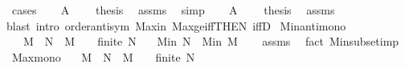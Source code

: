 \begin{isabellebody}
%
\isadelimproof
%
\endisadelimproof
%
\isatagproof
{}\isamarkupfalse%
\ cases\isanewline
\ \ \isamarkupfalse%
\ {\isachardoublequoteopen}A\ {\isacharequal}{\kern0pt}\ {\isacharbraceleft}{\kern0pt}{\isacharbraceright}{\kern0pt}{\isachardoublequoteclose}\ \isamarkupfalse%
\ {\isacharquery}{\kern0pt}thesis\ \isamarkupfalse%
\ assms\ \isamarkupfalse%
\ simp\isanewline
{}\isamarkupfalse%
\isanewline
\ \ \isamarkupfalse%
\ {\isachardoublequoteopen}A\ {\isasymnoteq}\ {\isacharbraceleft}{\kern0pt}{\isacharbraceright}{\kern0pt}{\isachardoublequoteclose}\ \isamarkupfalse%
\ {\isacharquery}{\kern0pt}thesis\ \isamarkupfalse%
\ assms\isanewline
\ \ \ \ \isamarkupfalse%
{\isacharparenleft}{\kern0pt}blast\ intro{\isacharcolon}{\kern0pt}\ order{\isachardot}{\kern0pt}antisym\ Max{\isacharunderscore}{\kern0pt}in\ Max{\isacharunderscore}{\kern0pt}ge{\isacharunderscore}{\kern0pt}iff{\isacharbrackleft}{\kern0pt}THEN\ iffD{}{\isacharbrackright}{\kern0pt}{\isacharparenright}{\kern0pt}\isanewline
{}\isamarkupfalse%
%
\endisatagproof
{\isafoldproof}%
%
\isadelimproof
\isanewline
%
\endisadelimproof
\isanewline
{}\isamarkupfalse%
\ Min{\isacharunderscore}{\kern0pt}antimono{\isacharcolon}{\kern0pt}\isanewline
\ \ \ {\isachardoublequoteopen}M\ {\isasymsubseteq}\ N{\isachardoublequoteclose}\ \ {\isachardoublequoteopen}M\ {\isasymnoteq}\ {\isacharbraceleft}{\kern0pt}{\isacharbraceright}{\kern0pt}{\isachardoublequoteclose}\ \ {\isachardoublequoteopen}finite\ N{\isachardoublequoteclose}\isanewline
\ \ \ {\isachardoublequoteopen}Min\ N\ {\isasymle}\ Min\ M{\isachardoublequoteclose}\isanewline
%
\isadelimproof
\ \ %
\endisadelimproof
%
\isatagproof
{}\isamarkupfalse%
\ assms\ \isamarkupfalse%
\ {\isacharparenleft}{\kern0pt}fact\ Min{\isachardot}{\kern0pt}subset{\isacharunderscore}{\kern0pt}imp{\isacharparenright}{\kern0pt}%
\endisatagproof
{\isafoldproof}%
%
\isadelimproof
\isanewline
%
\endisadelimproof
\isanewline
{}\isamarkupfalse%
\ Max{\isacharunderscore}{\kern0pt}mono{\isacharcolon}{\kern0pt}\isanewline
\ \ \ {\isachardoublequoteopen}M\ {\isasymsubseteq}\ N{\isachardoublequoteclose}\ \ {\isachardoublequoteopen}M\ {\isasymnoteq}\ {\isacharbraceleft}{\kern0pt}{\isacharbraceright}{\kern0pt}{\isachardoublequoteclose}\ \ {\isachardoublequoteopen}finite\ N{\isachardoublequoteclose}\isanewline

\end{isabellebody}
